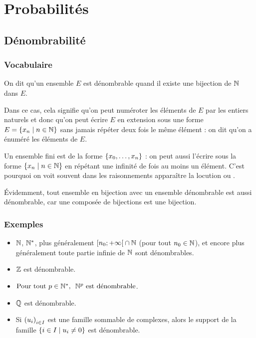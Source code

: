 \chapter{Probabilités}

\minitoc

\section{Dénombrabilité}

\subsection{Vocabulaire}

\begin{defi}
On dit qu'un ensemble \(E\) est dénombrable quand il existe une bijection de \(\mathbb{N}\) dans \(E\).
\end{defi}

Dans ce cas, cela signifie qu'on peut numéroter les éléments de \(E\) par les entiers naturels et donc qu'on peut écrire \(E\) en extension sous une forme \(E=\left\lbrace x_n\;\middle|\; n\in\mathbb{N}\right\rbrace\) sans jamais répéter deux fois le même élément : on dit qu'on a énuméré les éléments de \(E\).

Un ensemble fini est de la forme \(\left\lbrace x_0,\dots,x_n\right\rbrace\) : on peut aussi l'écrire sous la forme \(\left\lbrace x_n\;\middle|\; n\in\mathbb{N}\right\rbrace\) en répétant une infinité de fois au moins un élément. C'est pourquoi on voit souvent dans les raisonnements apparaître la locution  ou .

Évidemment, tout ensemble en bijection avec un ensemble dénombrable est aussi dénombrable, car une composée de bijections est une bijection.

\subsection{Exemples}

\begin{prop}
\begin{itemize}
    \item \(\mathbb{N}\), \(\mathbb{N}^*\), plus généralement \(\left[n_0;+\infty\right[\cap\mathbb{N}\) (pour tout \(n_0\in\mathbb{N}\)), et encore plus généralement toute partie infinie de \(\mathbb{N}\) sont dénombrables. \\
    \item \(\mathbb{Z}\) est dénombrable. \\
    \item \(\quantifs{\Tpt p\in\Ns}\N^p\text{ est dénombrable}\). \\
    \item \(\mathbb{Q}\) est dénombrable. \\
    \item Si \(\left(u_i\right)_{i\in I}\) est une famille sommable de complexes, alors le support de la famille \(\left\lbrace i\in I\;\middle|\; u_i\not=0\right\rbrace\) est dénombrable.
\end{itemize}
\end{prop}

